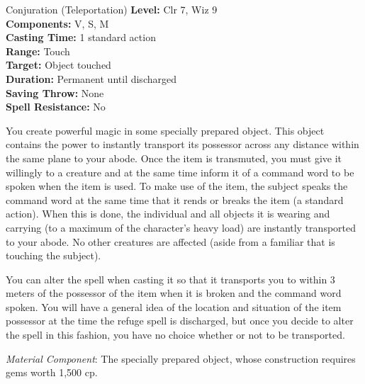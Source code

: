 {Conjuration (Teleportation)}
{
	\textbf{Level:}
	Clr 7, Wiz 9\\
	\textbf{Components:}
	V, S, M\\
	\textbf{Casting Time:}
	1 standard action\\
	\textbf{Range:}
	Touch\\
	\textbf{Target:}
	Object touched\\
	\textbf{Duration:}
	Permanent until discharged\\
	\textbf{Saving Throw:}
	None\\
	\textbf{Spell Resistance:}
	No\\
}
{
	You create powerful magic in some specially prepared object. This object contains the power to instantly transport its possessor across any distance within the same plane to your abode. Once the item is transmuted, you must give it willingly to a creature and at the same time inform it of a command word to be spoken when the item is used. To make use of the item, the subject speaks the command word at the same time that it rends or breaks the item (a standard action). When this is done, the individual and all objects it is wearing and carrying (to a maximum of the character's heavy load) are instantly transported to your abode. No other creatures are affected (aside from a familiar that is touching the subject).

	You can alter the spell when casting it so that it transports you to within 3 meters of the possessor of the item when it is broken and the command word spoken. You will have a general idea of the location and situation of the item possessor at the time the refuge spell is discharged, but once you decide to alter the spell in this fashion, you have no choice whether or not to be transported.

	\textit{Material Component}:
	The specially prepared object, whose construction requires gems worth 1,500 cp.

}
